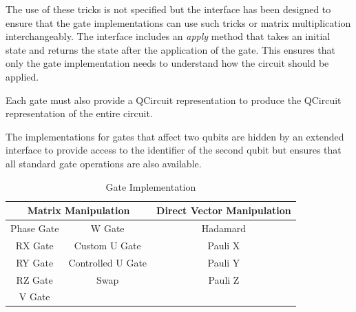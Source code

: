 The use of these tricks is not specified but the interface has been designed to ensure that the gate implementations can use such tricks or matrix multiplication interchangeably.
The interface includes an \emph{apply} method that takes an initial state and returns the state after the application of the gate.
This ensures that only the gate implementation needs to understand how the circuit should be applied.

Each gate must also provide a QCircuit \cite{QCsite} representation to produce the QCircuit representation of the entire circuit.

The implementations for gates that affect two qubits are hidden by an extended interface to provide access to the identifier of the second qubit but ensures that all standard gate operations are also available.

\begin{table}
\centering
\begin{tabular}{ | c | c || c | }
\hline
\multicolumn{2}{|c||}{\textbf{Matrix Manipulation}} & \textbf{Direct Vector Manipulation} \\ \hline
Phase Gate & W Gate &Hadamard \\ \hline
RX Gate &Custom U Gate & Pauli X \\ \hline
RY Gate &Controlled U Gate & Pauli Y \\ \hline
RZ Gate &Swap & Pauli Z \\ \hline
V Gate && \\ \hline
\end{tabular}
\caption{Gate Implementation}
\label{tab:gateimps}
\end{table}

